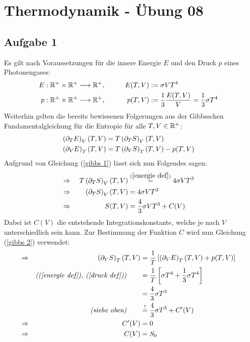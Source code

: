 
	
	\section*{\centering Thermodynamik - Übung 08} %
	\label{sec:thermodynamik_bung_07}
	
		\subsection*{Aufgabe 1} %
		\label{sub:aufgabe_1}
		
			Es gilt nach Voraussetzungen für die innere Energie $E$ und den Druck $p$ eines Photonengases:
			\begin{alignat}{3}
				\label{energie def}
				E&:\mathbb{R}^+\times\mathbb{R}^+\longrightarrow\mathbb{R}^+, \qquad &E(T,V)&:=\sigma VT^4 \\
				\label{druck def}
				p&:\mathbb{R}^+\times\mathbb{R}^+\longrightarrow\mathbb{R}^+, \qquad &p(T,V)&:=\dfrac{1}{3}\dfrac{E(T,V)}{V}=\dfrac{1}{3}\sigma T^4
			\end{alignat}
			Weiterhin gelten die bereits bewiesenen Folgerungen aus der Gibbsschen Fundamentalgleichung für die Entropie  für alle $T,V \in \mathbb{R}^+$:
			\begin{align}
				\label{gibbs 1}
				\left(  \partial_T E  \right)_V(T,V) &= T\left(  \partial_T S  \right)_V(T,V) \\
				\label{gibbs 2}
				\left(  \partial_V E  \right)_T(T,V) &= T\left(  \partial_V S  \right)_T(T,V) - p(T,V) 
			\end{align}
			Aufgrund von Gleichung (\ref{gibbs 1}) lässt sich nun Folgendes sagen:
			\begin{alignat*}{3}
				\Rightarrow&& \ T\left(  \partial_T S  \right)_V(T,V) &\overset{(\ref{energie def})}{=} 4\sigma VT^3 \\
				\Rightarrow&& \ \left(  \partial_T S  \right)_V(T,V) &= 4\sigma VT^2 \\
				\Rightarrow&& \ S(T,V) &= \dfrac{4}{3}\sigma VT^3 + C(V)
			\end{alignat*}
			Dabei ist $C(V)$ die entstehende Integrationskonstante, welche je nach $V$ unterschiedlich sein kann. 
			Zur Bestimmung der Funktion $C$ wird nun Gleichung (\ref{gibbs 2}) verwendet:
			\begin{alignat*}{3}
				\Rightarrow&& \ \left(  \partial_V S  \right)_T(T,V) &= \dfrac{1}{T}\left[  \left(  \partial_V E  \right)_T(T,V) + p(T,V)  \right] \\
				&&\textit{((\ref{energie def}), (\ref{druck def}))} \qquad &= \dfrac{1}{T}\left[  \sigma T^4 + \dfrac{1}{3}\sigma T^4  \right] \\
				&& &= \dfrac{4}{3}\sigma T^3 \\
				&&\textit{(siehe oben)} \qquad &\overset{!}{=} \dfrac{4}{3}\sigma T^3 + C^\prime(V) \\
				\Rightarrow&& \ C^\prime(V) &= 0 \\
				\Rightarrow&& \ C(V) &= S_0
			\end{alignat*}
